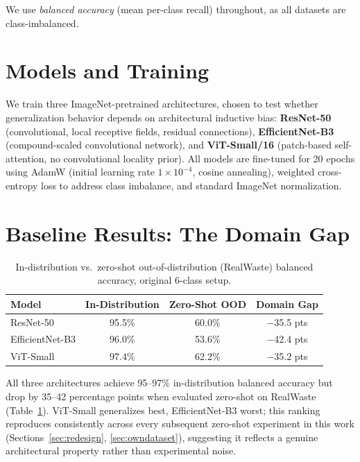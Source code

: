 \documentclass[a4paper]{article}
\begin{document}
We use \emph{balanced accuracy} (mean per-class recall) throughout, as all datasets are class-imbalanced.

\section{Models and Training}
\label{sec:models}

We train three ImageNet-pretrained architectures, chosen to test whether generalization behavior depends on architectural inductive bias: \textbf{ResNet-50} \citep{He_2016_CVPR} (convolutional, local receptive fields, residual connections), \textbf{EfficientNet-B3} \citep{tan2019efficientnet} (compound-scaled convolutional network), and \textbf{ViT-Small/16} \citep{dosovitskiy2021vit} (patch-based self-attention, no convolutional locality prior). All models are fine-tuned for 20 epochs using AdamW (initial learning rate $1\times10^{-4}$, cosine annealing), weighted cross-entropy loss to address class imbalance, and standard ImageNet normalization.

\section{Baseline Results: The Domain Gap}
\label{sec:baseline}

\begin{table}[t]
\caption{In-distribution vs.\ zero-shot out-of-distribution (RealWaste) balanced accuracy, original 6-class setup.}
\label{tab:baseline}
\centering
\begin{tabular}{lccc}
\toprule
Model & In-Distribution & Zero-Shot OOD & Domain Gap \\
\midrule
ResNet-50 & 95.5\% & 60.0\% & $-$35.5 pts \\
EfficientNet-B3 & 96.0\% & 53.6\% & $-$42.4 pts \\
ViT-Small & 97.4\% & 62.2\% & $-$35.2 pts \\
\bottomrule
\end{tabular}
\end{table}

All three architectures achieve 95--97\% in-distribution balanced accuracy but drop by 35--42 percentage points when evaluated zero-shot on RealWaste (Table~\ref{tab:baseline}). ViT-Small generalizes best, EfficientNet-B3 worst; this ranking reproduces consistently across every subsequent zero-shot experiment in this work (Sections~\ref{sec:redesign}, \ref{sec:owndataset}), suggesting it reflects a genuine architectural property rather than experimental noise.
\end{document}
